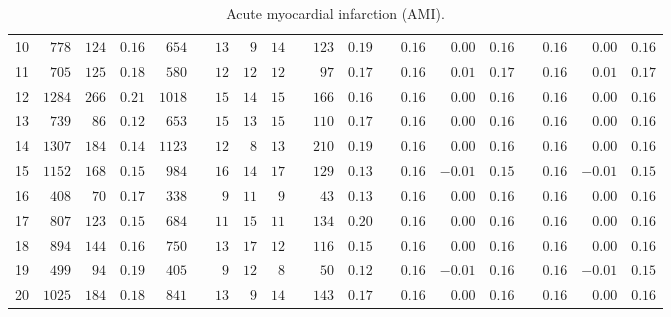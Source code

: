 \documentclass[]{article}\usepackage[]{graphicx}\usepackage[]{color}
\begin{document}
\begin{landscape}
\begin{table}[!tbp]
\begin{center}
\begin{tabular}{lrrrrcrrrcrrcrrrcrrr}
10&$ 778$&$124$&$0.16$&$ 654$&&$13$&$ 9$&$14$&&$123$&$0.19$&&$0.16$&$ 0.00$&$0.16$&&$0.16$&$ 0.00$&$0.16$\tabularnewline
11&$ 705$&$125$&$0.18$&$ 580$&&$12$&$12$&$12$&&$ 97$&$0.17$&&$0.16$&$ 0.01$&$0.17$&&$0.16$&$ 0.01$&$0.17$\tabularnewline
12&$1284$&$266$&$0.21$&$1018$&&$15$&$14$&$15$&&$166$&$0.16$&&$0.16$&$ 0.00$&$0.16$&&$0.16$&$ 0.00$&$0.16$\tabularnewline
13&$ 739$&$ 86$&$0.12$&$ 653$&&$15$&$13$&$15$&&$110$&$0.17$&&$0.16$&$ 0.00$&$0.16$&&$0.16$&$ 0.00$&$0.16$\tabularnewline
14&$1307$&$184$&$0.14$&$1123$&&$12$&$ 8$&$13$&&$210$&$0.19$&&$0.16$&$ 0.00$&$0.16$&&$0.16$&$ 0.00$&$0.16$\tabularnewline
15&$1152$&$168$&$0.15$&$ 984$&&$16$&$14$&$17$&&$129$&$0.13$&&$0.16$&$-0.01$&$0.15$&&$0.16$&$-0.01$&$0.15$\tabularnewline
16&$ 408$&$ 70$&$0.17$&$ 338$&&$ 9$&$11$&$ 9$&&$ 43$&$0.13$&&$0.16$&$ 0.00$&$0.16$&&$0.16$&$ 0.00$&$0.16$\tabularnewline
17&$ 807$&$123$&$0.15$&$ 684$&&$11$&$15$&$11$&&$134$&$0.20$&&$0.16$&$ 0.00$&$0.16$&&$0.16$&$ 0.00$&$0.16$\tabularnewline
18&$ 894$&$144$&$0.16$&$ 750$&&$13$&$17$&$12$&&$116$&$0.15$&&$0.16$&$ 0.00$&$0.16$&&$0.16$&$ 0.00$&$0.16$\tabularnewline
19&$ 499$&$ 94$&$0.19$&$ 405$&&$ 9$&$12$&$ 8$&&$ 50$&$0.12$&&$0.16$&$-0.01$&$0.16$&&$0.16$&$-0.01$&$0.15$\tabularnewline
20&$1025$&$184$&$0.18$&$ 841$&&$13$&$ 9$&$14$&&$143$&$0.17$&&$0.16$&$ 0.00$&$0.16$&&$0.16$&$ 0.00$&$0.16$\tabularnewline
\hline
\end{tabular}

\caption{Acute myocardial infarction (AMI).\label{round}}\end{center}

\end{table}




\end{landscape}
\end{document}

